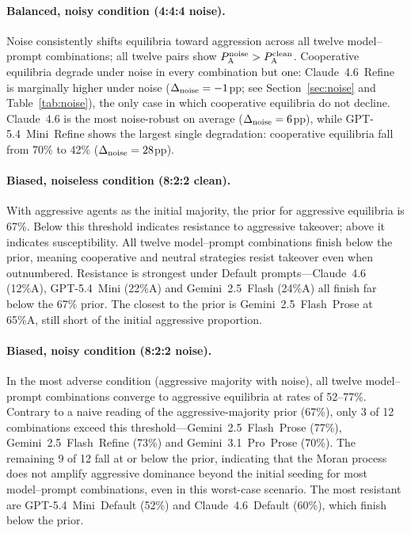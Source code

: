 \paragraph{Balanced, noisy condition (4:4:4 noise).}
Noise consistently shifts equilibria toward aggression across all twelve
model--prompt combinations; all twelve pairs show
$P_{\mathrm{A}}^{\text{noise}} > P_{\mathrm{A}}^{\text{clean}}$.
Cooperative equilibria degrade under noise in every combination but one:
Claude~4.6~Refine is marginally higher under noise ($\Delta_{\mathrm{noise}} = -1$pp;
see Section~\ref{sec:noise} and Table~\ref{tab:noise}), the only case
in which cooperative equilibria do not decline.
Claude~4.6 is the most noise-robust on average ($\Delta_{\mathrm{noise}} = 6$pp), while
GPT-5.4~Mini~Refine shows the largest single degradation:
cooperative equilibria fall from 70\% to 42\% ($\Delta_{\mathrm{noise}} = 28$pp).

\paragraph{Biased, noiseless condition (8:2:2 clean).}
With aggressive agents as the initial majority, the prior for aggressive
equilibria is 67\%. Below this threshold indicates resistance to aggressive
takeover; above it indicates susceptibility. All twelve model--prompt
combinations finish below the prior, meaning cooperative and neutral
strategies resist takeover even when outnumbered. Resistance is strongest
under Default prompts---Claude~4.6 (12\%A), GPT-5.4~Mini (22\%A) and
Gemini~2.5~Flash (24\%A) all finish far below the 67\% prior. The closest
to the prior is Gemini~2.5~Flash~Prose at 65\%A, still short of the initial
aggressive proportion.

\paragraph{Biased, noisy condition (8:2:2 noise).}
In the most adverse condition (aggressive majority with noise), all twelve
model--prompt combinations converge to aggressive equilibria at rates of
52--77\%. Contrary to a naive reading of the aggressive-majority prior (67\%),
only 3 of 12 combinations exceed this threshold---Gemini~2.5~Flash~Prose (77\%),
Gemini~2.5~Flash~Refine (73\%) and Gemini~3.1~Pro~Prose (70\%). The remaining
9 of 12 fall at or below the prior, indicating that the Moran process does not
amplify aggressive dominance beyond the initial seeding for most model--prompt
combinations, even in this worst-case scenario. The most resistant are
GPT-5.4~Mini~Default (52\%) and Claude~4.6~Default (60\%), which finish below
the prior.

